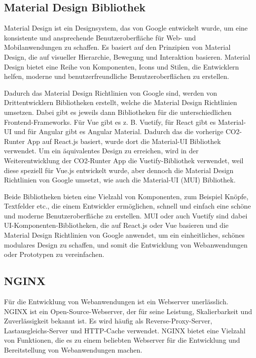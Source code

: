 \subsection{Material Design Bibliothek}

Material Design ist ein Designsystem, das von Google entwickelt wurde, um eine konsistente und ansprechende Benutzeroberfläche für Web- und Mobilanwendungen zu schaffen. Es basiert auf den Prinzipien von Material Design, die auf visueller Hierarchie, Bewegung und Interaktion basieren. Material Design bietet eine Reihe von Komponenten, Icons und Stilen, die Entwicklern helfen, moderne und benutzerfreundliche Benutzeroberflächen zu erstellen. \cite{materialdesign}

Dadurch das Material Design Richtlinien von Google sind, werden von Drittentwicklern Bibliotheken erstellt, welche die Material Design Richtlinien umsetzen. Dabei gibt es jeweils dann Bibliotheken für die unterschiedlichen Frontend-Frameworks. Für Vue gibt es z. B. Vuetify, für React gibt es Material-UI und für Angular gibt es Angular Material. Dadurch das die vorherige CO2-Runter App auf React.js basiert, wurde dort die Material-UI Bibliothek verwendet. Um ein äquivalentes Design zu erreichen, wird in der Weiterentwicklung der CO2-Runter App die Vuetify-Bibliothek verwendet, weil diese speziell für Vue.js entwickelt wurde, aber dennoch die Material Design Richtlinien von Google umsetzt, wie auch die Material-UI (MUI) Bibliothek.

Beide Bibliotheken bieten eine Vielzahl von Komponenten, zum Beispiel Knöpfe, Textfelder etc., die einem Entwickler ermöglichen, schnell und einfach eine schöne und moderne Benutzeroberfläche zu erstellen. \acf{MUI} oder auch Vuetify sind dabei \acs{UI}-Komponenten-Bibliotheken, die auf React.js oder Vue basieren und die Material Design Richtlinien von Google anwendet, um ein einheitliches, schönes modulares Design zu schaffen, und somit die Entwicklung von Webanwendungen oder Prototypen zu vereinfachen.\cite{materialui, vuetify}

\subsection{NGINX}


Für die Entwicklung von Webanwendungen ist ein Webserver unerlässlich. \acf{NGINX} ist ein Open-Source-Webserver, der für seine Leistung, Skalierbarkeit und Zuverlässigkeit bekannt ist. Es wird häufig als Reverse-Proxy-Server, Lastausgleichs-Server und HTTP-Cache verwendet. \acs{NGINX} bietet eine Vielzahl von Funktionen, die es zu einem beliebten Webserver für die Entwicklung und Bereitstellung von Webanwendungen machen.

